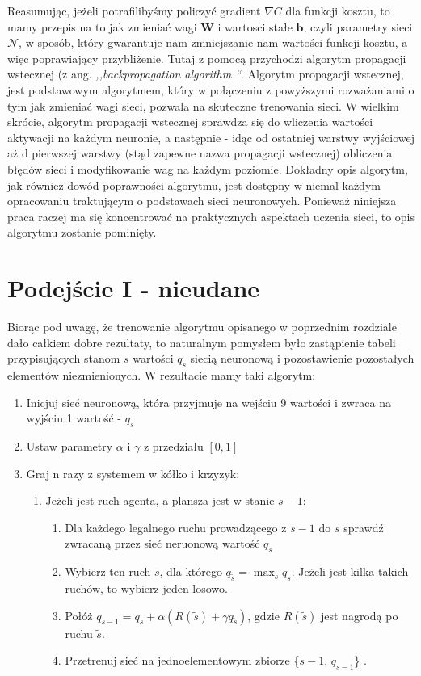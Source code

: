 \documentclass[licencjacka]{pracamgr}
\begin{document}
Reasumując, jeżeli potrafilibyśmy policzyć gradient $\nabla C$ dla funkcji kosztu, to mamy przepis na to jak zmieniać wagi $\mathbf{W}$ i wartosci stałe $\mathbf{b}$, czyli parametry sieci $\mathcal{N}$, w sposób, który gwarantuje nam zmniejszanie nam wartości funkcji kosztu, a więc poprawiający przybliżenie. Tutaj z pomocą przychodzi algorytm propagacji wstecznej (z ang. \textit{,,backpropagation algorithm ``}. Algorytm propagacji wstecznej, jest podstawowym algorytmem, który w połączeniu z powyższymi rozważaniami o tym jak zmieniać wagi sieci, pozwala na skuteczne trenowania sieci. W wielkim skrócie, algorytm propagacji wstecznej sprawdza się do wliczenia wartości aktywacji na każdym neuronie, a następnie - idąc od ostatniej warstwy wyjściowej aż d pierwszej warstwy (stąd zapewne nazwa propagacji wstecznej) obliczenia błędów sieci i modyfikowanie wag na każdym poziomie. Dokładny opis algorytm, jak również dowód poprawności algorytmu, jest dostępny w niemal każdym opracowaniu traktującym o podstawach sieci neuronowych. Ponieważ niniejsza praca raczej ma się koncentrować na praktycznych aspektach uczenia sieci, to opis algorytmu zostanie pominięty.

\section{Podejście I - nieudane}

Biorąc pod uwagę, że trenowanie algorytmu opisanego w poprzednim rozdziale dało całkiem dobre rezultaty, to naturalnym pomysłem było zastąpienie tabeli przypisujących stanom $s$ wartości $q_{s}$ siecią neuronową i pozostawienie pozostałych elementów niezmienionych. W rezultacie mamy taki algorytm:

\begin{enumerate}
	\item{Inicjuj sieć neuronową, która przyjmuje na wejściu 9 wartości i zwraca na wyjściu 1 wartość -  $q_{s}$}
	\item{Ustaw parametry $\alpha$ i $\gamma$ z przedziału $[0, 1]$}
	\item{Graj n razy z systemem w kółko i krzyzyk:}
	\begin{enumerate}
		\item{Jeżeli jest ruch agenta, a plansza jest w stanie $s-1$:}
		\begin{enumerate}
			\item{Dla każdego legalnego ruchu prowadzącego z $s-1$ do $s$  sprawdź zwracaną przez sieć neruonową wartość $q_{s}$}
			\item{Wybierz ten ruch $\tilde{s}$, dla którego $q_{\tilde{s}} =\max_{s} q_{s}$. Jeżeli jest kilka takich ruchów, to wybierz jeden losowo.}
			\item{Połóż $q_{s-1} = q_{s} + \alpha(R(\tilde{s}) + \gamma  q_{\tilde{s}} )$, gdzie $R(\tilde{s})$ jest nagrodą po ruchu $\tilde{s}$. }
			\item{Przetrenuj sieć na jednoelementowym zbiorze \{$s-1$, $q_{s-1}$\} }.
		\end{enumerate}
	\end{enumerate}
\end{enumerate}
\end{document}
